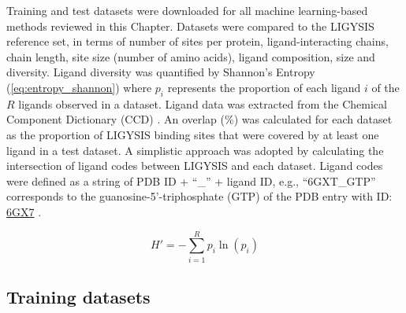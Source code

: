 Training and test datasets were downloaded for all machine learning-based methods reviewed in this Chapter. Datasets were compared to the LIGYSIS reference set, in terms of number of sites per protein, ligand-interacting chains, chain length, site size (number of amino acids), ligand composition, size and diversity. Ligand diversity was quantified by Shannon's Entropy \cite{SHANNON_1948_ENTROPY} (\autoref{eq:entropy_shannon}) where $p_i$ represents the proportion of each ligand $i$ of the $R$ ligands observed in a dataset. Ligand data was extracted from the Chemical Component Dictionary (CCD) \cite{WESTBROOK_2015_CCD}. An overlap (\%) was calculated for each dataset as the proportion of LIGYSIS binding sites that were covered by at least one ligand in a test dataset. A simplistic approach was adopted by calculating the intersection of ligand codes between LIGYSIS and each dataset. Ligand codes were defined as a string of PDB ID + ``\_'' + ligand ID, e.g., ``6GXT\_GTP'' corresponds to the guanosine-5’-triphosphate (GTP) of the PDB entry with ID: \href{https://www.ebi.ac.uk/pdbe/entry/pdb/6gx7}{6GX7} \cite{CAMPANACCI_2019_TUBULIN}.

\begin{equation}
H' = - \sum_{i=1}^{R} p_i \ln(p_i)
\label{eq:entropy_shannon}
\end{equation}

\subsection{Training datasets}

